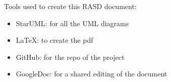 \clearpage
{}
\label{sect:userInterface}


\clearpage
{}
\label{sect:requirements}


\clearpage
{}
\label{sect:implementation}


\clearpage
{}
\label{sect:effort}


\clearpage
{}
\color{Black}
Tools used to create this RASD document:\\
\begin {itemize}
	\item StarUML: for all the UML diagrams
	\item LaTeX: to create the pdf
	\item GitHub: for the repo of the project
	\item GoogleDoc: for a shared editing of the document
\end {itemize}






